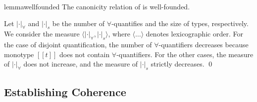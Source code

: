 \begin{restatable}{lemma}{wellfounded}\label{lemma:well-founded}
  The canonicity relation of \fnamee is well-founded.
\end{restatable}
\proof
  Let $| \cdot |_{\forall}$ and $| \cdot |_s$ be the number of
  $\forall$-quantifies and the size of types, respectively. We consider the measure $\langle
  | \cdot |_{\forall} , | \cdot |_s \rangle$,
  where $\langle \dots \rangle$ denotes lexicographic order. For the case of
  disjoint quantification, the number of $\forall$-quantifiers decreases because monotype $[[t]]$ does not contain $\forall$-quantifiers.
  For the other cases, the measure of $| \cdot |_{\forall}$ does not increase, and
  the measure of $| \cdot |_s$ strictly decreases.
\qed







\subsection{Establishing Coherence}

